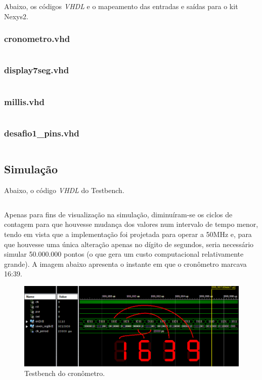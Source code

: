 \documentclass[12pt]{article}
\begin{document}
Abaixo, os códigos \emph{VHDL} e o mapeamento das entradas e saídas para o kit Nexys2.

\subsubsection{cronometro.vhd}
\inputminted{vhdl}{cronometro.vhd}

\subsubsection{display7seg.vhd}
\inputminted{vhdl}{display7seg.vhd}

\subsubsection{millis.vhd}
\inputminted{vhdl}{millis.vhd}

\subsubsection{desafio1\_pins.vhd}
\inputminted{vhdl}{cronometro_pins.ucf}

\subsection{Simulação}

Abaixo, o código \emph{VHDL} do Testbench.

\inputminted{vhdl}{cronometro_tb.vhd}

\clearpage

Apenas para fins de visualização na simulação, diminuíram-se os ciclos de contagem para que houvesse mudança dos valores num intervalo de tempo menor, tendo em vista que a implementação foi projetada para operar a 50MHz e, para que houvesse uma única alteração apenas no dígito de segundos, seria necessário simular 50.000.000 pontos (o que gera um custo computacional relativamente grande). A imagem abaixo apresenta o instante em que o cronômetro marcava 16:39.

\begin{figure}[!h]
    \centering
    \includegraphics[width=1.0\textwidth]{tb.png}
    \caption{Testbench do cronômetro.}
\end{figure}
\end{document}
